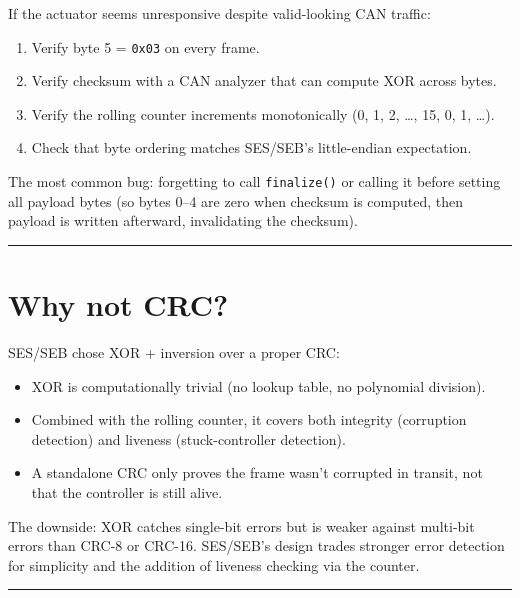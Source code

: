 \documentclass[12pt,a4paper,oneside]{report}
\providecommand{\tightlist}{\setlength{\itemsep}{0pt}\setlength{\parskip}{0pt}}
\begin{document}
If the actuator seems unresponsive despite valid-looking CAN traffic:

\begin{enumerate}
\def\labelenumi{\arabic{enumi}.}
\tightlist
\item
  Verify byte 5 = \texttt{0x03} on every frame.
\item
  Verify checksum with a CAN analyzer that can compute XOR across bytes.
\item
  Verify the rolling counter increments monotonically (0, 1, 2, \ldots, 15, 0,
  1, \ldots).
\item
  Check that byte ordering matches SES/SEB's little-endian expectation.
\end{enumerate}

The most common bug: forgetting to call \texttt{finalize()} or calling it before
setting all payload bytes (so bytes 0--4 are zero when checksum is computed,
then payload is written afterward, invalidating the checksum).

\begin{center}\rule{0.5\linewidth}{0.5pt}\end{center}

\section{Why not CRC?}\label{why-not-crc}

SES/SEB chose XOR + inversion over a proper CRC:

\begin{itemize}
\tightlist
\item
  XOR is computationally trivial (no lookup table, no polynomial division).
\item
  Combined with the rolling counter, it covers both integrity (corruption
  detection) and liveness (stuck-controller detection).
\item
  A standalone CRC only proves the frame wasn't corrupted in transit, not that
  the controller is still alive.
\end{itemize}

The downside: XOR catches single-bit errors but is weaker against multi-bit
errors than CRC-8 or CRC-16. SES/SEB's design trades stronger error detection
for simplicity and the addition of liveness checking via the counter.

\begin{center}\rule{0.5\linewidth}{0.5pt}\end{center}
\end{document}
